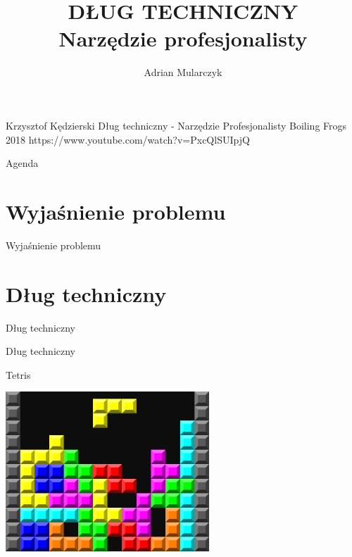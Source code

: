 \documentclass{beamer}
\title[]
{DŁUG TECHNICZNY\\
Narzędzie profesjonalisty}
\author[Adrian Mularczyk]{Adrian Mularczyk}
\institute[PGS Softwarei]
{
PGS Software
}
\date{}
\begin{document}
\begin{frame}
  \titlepage 
\end{frame}

\begin{frame}{}
\Huge{Krzysztof Kędzierski\newline\newline}
\Large{Dług techniczny - Narzędzie Profesjonalisty\newline\newline}
\Large{Boiling Frogs 2018\newline\newline}
\Large{https://www.youtube.com/watch?v=PxcQlSUIpjQ}
\end{frame}

\begin{frame}{Agenda}
  \tableofcontents
\end{frame}

\section{Wyjaśnienie problemu}

\begin{frame}{}
\begin{center}
\Huge{Wyjaśnienie problemu}
\end{center}
\end{frame}


\section{Dług techniczny}

\begin{frame}{Dług techniczny}
\begin{center}
\Huge{Dług techniczny}
\end{center}
\end{frame}

\begin{frame}{Tetris}
\begin{center}
  	\includegraphics[height=6cm]{tetris.jpg}
\end{center}
\end{frame}
\end{document}
